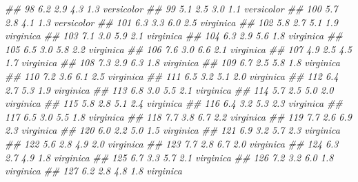 \documentclass[
  13,
  letterpaper,
]{report}
\newenvironment{Shaded}{\begin{snugshade}}{\end{snugshade}}
\newcommand{\DocumentationTok}[1]{\textcolor[rgb]{0.37,0.37,0.37}{\textit{#1}}}
\begin{document}
\begin{Shaded}
\begin{Highlighting}[]
\DocumentationTok{\#\# 98           6.2         2.9          4.3         1.3 versicolor}
\DocumentationTok{\#\# 99           5.1         2.5          3.0         1.1 versicolor}
\DocumentationTok{\#\# 100          5.7         2.8          4.1         1.3 versicolor}
\DocumentationTok{\#\# 101          6.3         3.3          6.0         2.5  virginica}
\DocumentationTok{\#\# 102          5.8         2.7          5.1         1.9  virginica}
\DocumentationTok{\#\# 103          7.1         3.0          5.9         2.1  virginica}
\DocumentationTok{\#\# 104          6.3         2.9          5.6         1.8  virginica}
\DocumentationTok{\#\# 105          6.5         3.0          5.8         2.2  virginica}
\DocumentationTok{\#\# 106          7.6         3.0          6.6         2.1  virginica}
\DocumentationTok{\#\# 107          4.9         2.5          4.5         1.7  virginica}
\DocumentationTok{\#\# 108          7.3         2.9          6.3         1.8  virginica}
\DocumentationTok{\#\# 109          6.7         2.5          5.8         1.8  virginica}
\DocumentationTok{\#\# 110          7.2         3.6          6.1         2.5  virginica}
\DocumentationTok{\#\# 111          6.5         3.2          5.1         2.0  virginica}
\DocumentationTok{\#\# 112          6.4         2.7          5.3         1.9  virginica}
\DocumentationTok{\#\# 113          6.8         3.0          5.5         2.1  virginica}
\DocumentationTok{\#\# 114          5.7         2.5          5.0         2.0  virginica}
\DocumentationTok{\#\# 115          5.8         2.8          5.1         2.4  virginica}
\DocumentationTok{\#\# 116          6.4         3.2          5.3         2.3  virginica}
\DocumentationTok{\#\# 117          6.5         3.0          5.5         1.8  virginica}
\DocumentationTok{\#\# 118          7.7         3.8          6.7         2.2  virginica}
\DocumentationTok{\#\# 119          7.7         2.6          6.9         2.3  virginica}
\DocumentationTok{\#\# 120          6.0         2.2          5.0         1.5  virginica}
\DocumentationTok{\#\# 121          6.9         3.2          5.7         2.3  virginica}
\DocumentationTok{\#\# 122          5.6         2.8          4.9         2.0  virginica}
\DocumentationTok{\#\# 123          7.7         2.8          6.7         2.0  virginica}
\DocumentationTok{\#\# 124          6.3         2.7          4.9         1.8  virginica}
\DocumentationTok{\#\# 125          6.7         3.3          5.7         2.1  virginica}
\DocumentationTok{\#\# 126          7.2         3.2          6.0         1.8  virginica}
\DocumentationTok{\#\# 127          6.2         2.8          4.8         1.8  virginica}

\end{Highlighting}
\end{Shaded}
\end{document}
